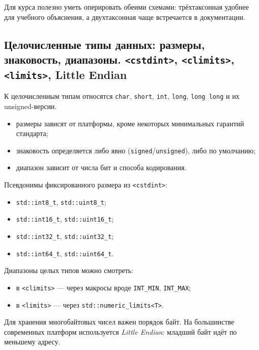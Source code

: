 \begin{remark}
Для курса полезно уметь оперировать обеими схемами: трёхтаксонная удобнее для учебного объяснения, а двухтаксонная чаще встречается в документации.
\end{remark}

\subsection{Целочисленные типы данных: размеры, знаковость, диапазоны. \texttt{<cstdint>}, \texttt{<climits>}, \texttt{<limits>}, Little Endian}
\begin{definition}
К целочисленным типам относятся \texttt{char}, \texttt{short}, \texttt{int}, \texttt{long}, \texttt{long long} и их unsigned-версии.
\end{definition}

\begin{itemize}
    \item размеры зависят от платформы, кроме некоторых минимальных гарантий стандарта;
    \item знаковость определяется либо явно (\texttt{signed}/\texttt{unsigned}), либо по умолчанию;
    \item диапазон зависит от числа бит и способа кодирования.
\end{itemize}

Псевдонимы фиксированного размера из \texttt{<cstdint>}:
\begin{itemize}
    \item \texttt{std::int8\_t}, \texttt{std::uint8\_t};
    \item \texttt{std::int16\_t}, \texttt{std::uint16\_t};
    \item \texttt{std::int32\_t}, \texttt{std::uint32\_t};
    \item \texttt{std::int64\_t}, \texttt{std::uint64\_t}.
\end{itemize}

Диапазоны целых типов можно смотреть:
\begin{itemize}
    \item в \texttt{<climits>} — через макросы вроде \texttt{INT\_MIN}, \texttt{INT\_MAX};
    \item в \texttt{<limits>} — через \texttt{std::numeric\_limits<T>}.
\end{itemize}

\begin{remark}
Для хранения многобайтовых чисел важен порядок байт. На большинстве современных платформ используется \textit{Little Endian}: младший байт идёт по меньшему адресу.
\end{remark}

